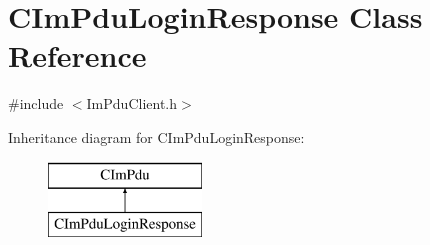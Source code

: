 \hypertarget{class_c_im_pdu_login_response}{}\section{C\+Im\+Pdu\+Login\+Response Class Reference}
\label{class_c_im_pdu_login_response}


{\ttfamily \#include $<$Im\+Pdu\+Client.\+h$>$}

Inheritance diagram for C\+Im\+Pdu\+Login\+Response\+:\begin{figure}[H]
\begin{center}
\leavevmode
\includegraphics[height=2.000000cm]{class_c_im_pdu_login_response}
\end{center}
\end{figure}
